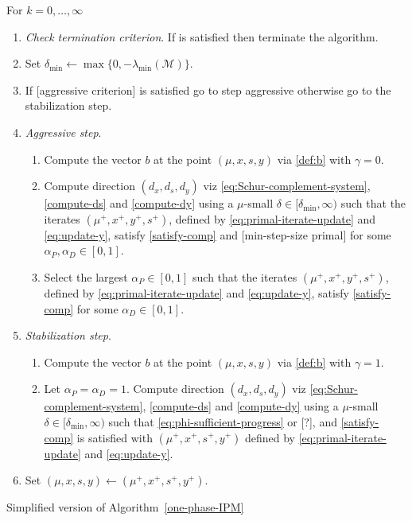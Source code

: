 \documentclass{article}
\begin{document}
\begin{algorithm}[H]
For $k = 0, \dots, \infty$
\begin{enumerate}[label*=A.{\arabic*}]
\item \emph{Check termination criterion}. If \termination{} is satisfied then terminate the algorithm.
\item Set $\delta_{\min} \gets \max\{0, -\lambda_{\min}(\mathcal{M}) \}$.
\item If [aggressive criterion] is satisfied go to step aggressive otherwise go to the stabilization step.
\item \emph{Aggressive step}. 
\begin{enumerate}
\item Compute the vector $b$ at the point $(\mu, x, s, y)$ via \eqref{def:b} with $\gamma = 0$.
\item Compute direction $(d_{x}, d_{s}, d_{y})$ viz  \eqref{eq:Schur-complement-system}, \eqref{compute-ds} and \eqref{compute-dy} using
a $\mu$-small $\delta \in [\delta_{\min}, \infty)$ such that the iterates $(\mu^{+}, x^{+}, y^{+}, s^{+})$, defined by \eqref{eq:primal-iterate-update} and \eqref{eq:update-y}, satisfy \eqref{satisfy-comp} and [min-step-size primal] for some $\alpha_{P}, \alpha_{D} \in [0,1]$.
\item Select the largest $\alpha_{P} \in [0,1]$ such that the iterates $(\mu^{+}, x^{+}, y^{+}, s^{+})$, defined by \eqref{eq:primal-iterate-update} and \eqref{eq:update-y}, satisfy \eqref{satisfy-comp} for some $\alpha_{D} \in [0,1]$.
\end{enumerate}
\item \emph{Stabilization step}. 
\begin{enumerate}
\item Compute the vector $b$ at the point $(\mu, x, s, y)$ via \eqref{def:b} with $\gamma = 1$.
\item Let  $\alpha_{P} = \alpha_{D} = 1$. Compute direction $(d_{x}, d_{s}, d_{y})$ viz  \eqref{eq:Schur-complement-system}, \eqref{compute-ds} and \eqref{compute-dy} using a $\mu$-small $\delta \in [\delta_{\min} ,\infty)$ such that \eqref{eq:phi-sufficient-progress} or [?], and \eqref{satisfy-comp} is satisfied with $(\mu^{+},x^{+}, s^{+}, y^{+})$ defined by \eqref{eq:primal-iterate-update} and \eqref{eq:update-y}.
\end{enumerate}
\item Set $(\mu,x, s, y) \gets (\mu^{+}, x^{+}, s^{+}, y^{+})$.
\end{enumerate}
\caption{Simplified version of Algorithm~\ref{one-phase-IPM}}\label{alg:naive}
\end{algorithm}
\end{document}
